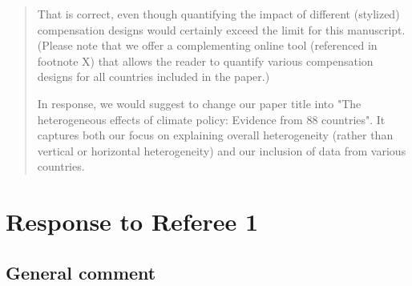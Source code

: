 \documentclass[11pt]{article}
\newenvironment{response}
{\begin{quote}\color{black}}
{\end{quote}}
\begin{document}
\begin{response}
    That is correct, even though quantifying the impact of different (stylized) compensation designs would certainly exceed the limit for this manuscript. (Please note that we offer a complementing online tool (referenced in footnote X) that allows the reader to quantify various compensation designs for all countries included in the paper.)

    In response, we would suggest to change our paper title into "The heterogeneous effects of climate policy: Evidence from 88 countries". It captures both our focus on explaining overall heterogeneity (rather than vertical or horizontal heterogeneity) and our inclusion of data from various countries.
\end{response}

\clearpage

\section*{Response to Referee 1}

\subsection*{General comment}\label{comment_R1_0}
\end{document}
